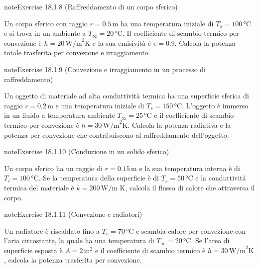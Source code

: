 \documentclass[letterpaper,10pt,italian]{jupyterBook}
\begin{document}
\begin{sphinxadmonition}{note}{Exercise 18.1.8 (Raffreddamento di un corpo sferico)}



\sphinxAtStartPar
Un corpo sferico con raggio \(r = 0.5 \, \text{m}\) ha una temperatura iniziale di \(T_s = 100 \, \text{°C}\) e si trova in un ambiente a \(T_\infty = 20 \, \text{°C}\). Il coefficiente di scambio termico per convezione è \(h = 20 \, \text{W/m}^2\text{K}\) e la sua emisività è \(e = 0.9\). Calcola la potenza totale trasferita per convezione e irraggiamento.
\end{sphinxadmonition}
 \label{exercise:ch/thermodynamics/heat-transmission-problems-exercise-8}

\begin{sphinxadmonition}{note}{Exercise 18.1.9 (Convezione e irraggiamento in un processo di raffreddamento)}



\sphinxAtStartPar
Un oggetto di materiale ad alta conduttività termica ha una superficie sferica di raggio \(r = 0.2 \, \text{m}\) e una temperatura iniziale di \(T_s = 150 \, \text{°C}\). L’oggetto è immerso in un fluido a temperatura ambiente \(T_\infty = 25 \, \text{°C}\) e il coefficiente di scambio termico per convezione è \(h = 30 \, \text{W/m}^2\text{K}\). Calcola la potenza radiativa e la potenza per convezione che contribuiscono al raffreddamento dell’oggetto.
\end{sphinxadmonition}
 \label{exercise:ch/thermodynamics/heat-transmission-problems-exercise-9}

\begin{sphinxadmonition}{note}{Exercise 18.1.10 (Conduzione in un solido sferico)}



\sphinxAtStartPar
Un corpo sferico ha un raggio di \(r = 0.15 \, \text{m}\) e la sua temperatura interna è di \(T_i = 100 \, \text{°C}\). Se la temperatura della superficie è di \(T_s = 50 \, \text{°C}\) e la conduttività termica del materiale è \(k = 200 \, \text{W/m K}\), calcola il flusso di calore che attraversa il corpo.
\end{sphinxadmonition}
 \label{exercise:ch/thermodynamics/heat-transmission-problems-exercise-10}

\begin{sphinxadmonition}{note}{Exercise 18.1.11 (Convezione e radiatori)}



\sphinxAtStartPar
Un radiatore è riscaldato fino a \(T_s = 70 \, \text{°C}\) e scambia calore per convezione con l’aria circostante, la quale ha una temperatura di \(T_\infty = 20 \, \text{°C}\). Se l’area di superficie esposta è \(A = 2 \, \text{m}^2\) e il coefficiente di scambio termico è \(h = 30 \, \text{W/m}^2\text{K}\), calcola la potenza trasferita per convezione.
\end{sphinxadmonition}
 \label{exercise:ch/thermodynamics/heat-transmission-problems-exercise-11}
\end{document}
